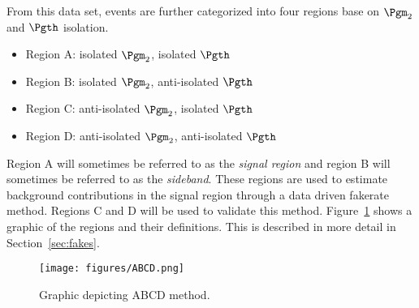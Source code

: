 From this data set, events are further categorized into four regions
base on $\Pgm_2$ and $\Pgth$ isolation.
\begin{itemize}
    \item Region A: isolated $\Pgm_2$, isolated $\Pgth$
    \item Region B: isolated $\Pgm_2$, anti-isolated $\Pgth$
    \item Region C: anti-isolated $\Pgm_2$, isolated $\Pgth$
    \item Region D: anti-isolated $\Pgm_2$, anti-isolated $\Pgth$
\end{itemize}
Region A will sometimes be referred to as the \textit{signal region}
and region B will sometimes be referred to as the \textit{sideband}.
These regions are used to estimate background contributions
in the signal region through a data driven fakerate method.
Regions C and D will be used to validate this method.
Figure~\ref{fig:ABCD} shows a graphic of the regions and their definitions.
This is described in more detail in Section~\ref{sec:fakes}.

\begin{figure}
  \centering
  \texttt{[image: figures/ABCD.png]}
    \captionsetup{format=hang}
  \caption{Graphic depicting ABCD method.}
  \label{fig:ABCD}
\end{figure}

